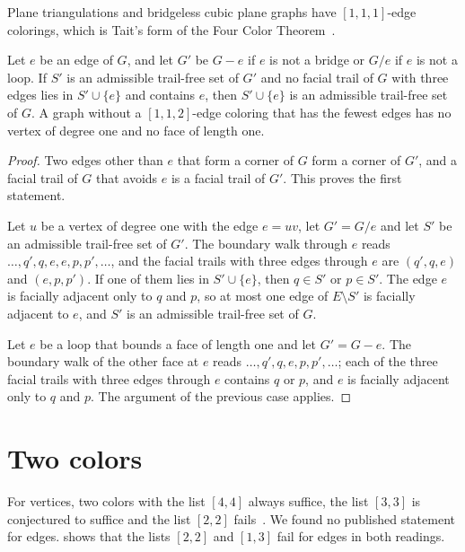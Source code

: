 \documentclass[11pt,a4paper]{article}
\begin{document}
Plane triangulations and bridgeless cubic plane graphs have $[1,1,1]$-edge colorings, which is Tait's form of the Four Color Theorem~\cite[p.~631]{Czap2019FacialRST}.

\begin{proposition}[Reduction]
\label{prop:reduction}
Let $e$ be an edge of $G$, and let $G'$ be $G-e$ if $e$ is not a bridge or $G/e$ if $e$ is not a loop.
If $S'$ is an admissible trail-free set of $G'$ and no facial trail of $G$ with three edges lies in $S'\cup\{e\}$ and contains $e$, then $S'\cup\{e\}$ is an admissible trail-free set of $G$.
A graph without a $[1,1,2]$-edge coloring that has the fewest edges has no vertex of degree one and no face of length one.
\end{proposition}

\begin{proof}
Two edges other than $e$ that form a corner of $G$ form a corner of $G'$, and a facial trail of $G$ that avoids $e$ is a facial trail of $G'$.
This proves the first statement.

Let $u$ be a vertex of degree one with the edge $e=uv$, let $G'=G/e$ and let $S'$ be an admissible trail-free set of $G'$.
The boundary walk through $e$ reads $\dots,q',q,e,e,p,p',\dots$, and the facial trails with three edges through $e$ are $(q',q,e)$ and $(e,p,p')$.
If one of them lies in $S'\cup\{e\}$, then $q\in S'$ or $p\in S'$.
The edge $e$ is facially adjacent only to $q$ and $p$, so at most one edge of $E\setminus S'$ is facially adjacent to $e$, and $S'$ is an admissible trail-free set of $G$.

Let $e$ be a loop that bounds a face of length one and let $G'=G-e$.
The boundary walk of the other face at $e$ reads $\dots,q',q,e,p,p',\dots$; each of the three facial trails with three edges through $e$ contains $q$ or $p$, and $e$ is facially adjacent only to $q$ and $p$.
The argument of the previous case applies.
\end{proof}

\section{Two colors}
\label{sec:two-colors}

For vertices, two colors with the list $[4,4]$ always suffice, the list $[3,3]$ is conjectured to suffice and the list $[2,2]$ fails~\cite[Theorems~1 and~4, Conjecture~3]{Czap2021FacialPaths}.
We found no published statement for edges.
 shows that the lists $[2,2]$ and $[1,3]$ fail for edges in both readings.
\end{document}
